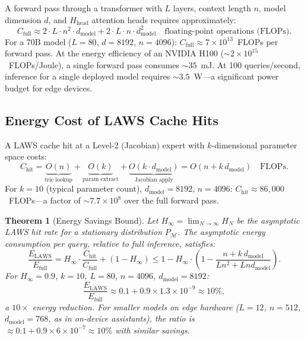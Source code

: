 \documentclass[11pt]{article}
\newtheorem{theorem}{Theorem}
\begin{document}
A forward pass through a transformer with $L$ layers, context length $n$,
model dimension $d$, and $H_{\mathrm{head}}$ attention heads requires approximately:
\[
  C_{\mathrm{full}} \approx 2 \cdot L \cdot n^2 \cdot d_{\mathrm{model}} + 2 \cdot L \cdot n \cdot d_{\mathrm{model}}^2
  \quad \text{floating-point operations (FLOPs).}
\]
For a 70B model ($L=80$, $d=8192$, $n=4096$): $C_{\mathrm{full}} \approx
7 \times 10^{13}$~FLOPs per forward pass.  At the energy efficiency of an
NVIDIA H100 ($\sim 2 \times 10^{15}$~FLOPs/Joule), a single forward pass
consumes $\sim 35$~mJ.  At 100 queries/second, inference for a single deployed
model requires $\sim 3.5$~W---a significant power budget for edge devices.

\subsection{Energy Cost of LAWS Cache Hits}

A LAWS cache hit at a Level-2 (Jacobian) expert with $k$-dimensional parameter
space costs:
\[
  C_{\mathrm{hit}} = \underbrace{O(n)}_{\text{trie lookup}}
  + \underbrace{O(k)}_{\text{param extract}}
  + \underbrace{O(k \cdot d_{\mathrm{model}})}_{\text{Jacobian apply}}
  = O(n + k\,d_{\mathrm{model}}) \quad \text{FLOPs.}
\]
For $k = 10$ (typical parameter count), $d_{\mathrm{model}} = 8192$, $n = 4096$:
$C_{\mathrm{hit}} \approx 86{,}000$~FLOPs---a factor of $\sim 7.7 \times 10^8$
over the full forward pass.

\begin{theorem}[Energy Savings Bound]
\label{thm:energy}
Let $H_\infty = \lim_{N \to \infty} H_N$ be the asymptotic LAWS hit rate
for a stationary distribution $P_{\mathcal{M}}$.  The asymptotic energy
consumption per query, relative to full inference, satisfies:
\[
  \frac{E_{\mathrm{LAWS}}}{E_{\mathrm{full}}}
  = H_\infty \cdot \frac{C_{\mathrm{hit}}}{C_{\mathrm{full}}} + (1 - H_\infty)
  \leq 1 - H_\infty \cdot \left(1 - \frac{n + k\,d_{\mathrm{model}}}{Ln^2 + Lnd_{\mathrm{model}}}\right).
\]
For $H_\infty = 0.9$, $k = 10$, $L = 80$, $n = 4096$, $d_{\mathrm{model}} = 8192$:
\[
  \frac{E_{\mathrm{LAWS}}}{E_{\mathrm{full}}} \approx 0.1 + 0.9 \times 1.3\times10^{-9}
  \approx 10\%,
\]
a $10\times$ energy reduction.  For smaller models on edge hardware ($L=12$,
$n=512$, $d_{\mathrm{model}}=768$, as in on-device assistants), the ratio is
$\approx 0.1 + 0.9 \times 6 \times 10^{-7} \approx 10\%$ with similar savings.
\end{theorem}
\end{document}
